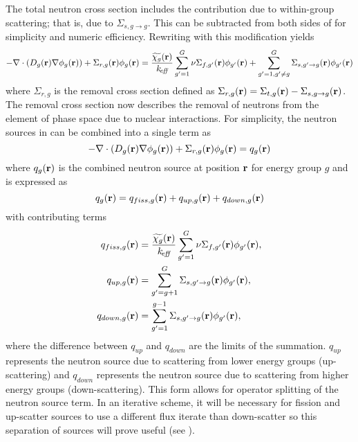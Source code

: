   The total neutron cross section includes the contribution due to within-group
  scattering; that is, due to $\Sigma_{s,g\rightarrow g}$. This can be
  subtracted from both sides of  for simplicity
  and numeric efficiency. Rewriting  with this
  modification yields
  \begin{equation} 
    \label{eq:multigroup_removal}
    - \mathbf{\nabla} \cdot( D_g(\mathbf{r}) \mathbf{\nabla} \phi_g(\mathbf{r})) + \Sigma_{r,g}(\mathbf{r}) \phi_g(\mathbf{r}) = 
      \frac{\widetilde{\chi_g}(\mathbf{r})}{k_{\!\mbox{\scriptsize \em eff}}} 
      \sum_{g'=1}^{G} \nu\Sigma_{f,g'}(\mathbf{r}) 
      \phi_{g'}(\mathbf{r}) + \sum_{g'=1, g' \ne g}^{G} 
      \Sigma_{s,g' \rightarrow g}(\mathbf{r}) \phi_{g'}(\mathbf{r})
  \end{equation}
  where $\Sigma_{r,g}$ is the removal cross section defined as
  $\Sigma_{r,g}(\mathbf{r}) = \Sigma_{t,g}(\mathbf{r}) - \Sigma_{s,g\rightarrow g}(\mathbf{r})$. The
  removal cross section now describes the removal of neutrons from the element
  of phase space due to nuclear interactions.  For simplicity, the neutron
  sources in  can be combined into a single term as
  \begin{equation}
    \label{eq:multigroup_source}
    - \mathbf{\nabla} \cdot( D_g(\mathbf{r}) \mathbf{\nabla} \phi_g(\mathbf{r})) + \Sigma_{r,g}(\mathbf{r}) \phi_g(\mathbf{r}) = 
      q_g(\mathbf{r})
  \end{equation}
  where $q_g(\mathbf{r})$ is the combined neutron source at position $\mathbf{r}$ for energy
  group $g$ and is expressed as
  \begin{equation}
    \label{eq:q}
    q_g(\mathbf{r}) = q_{fiss,g}(\mathbf{r}) + q_{up,g}(\mathbf{r}) + q_{down,g}(\mathbf{r}) 
  \end{equation}
  with contributing terms
  \begin{align}
    \label{eq:qfiss}
    q_{fiss,g}(\mathbf{r}) &= \frac{\widetilde{\chi_g}(\mathbf{r})}{k_{\!\mbox{\scriptsize \em eff}}} \sum_{g'=1}^{G} 
      \nu \Sigma_{f,g'}(\mathbf{r}) \phi_{g'}(\mathbf{r}), \\
    \label{eq:qup}
    q_{up,g}(\mathbf{r}) &= \sum_{g'=g+1}^{G} \Sigma_{s,g' \rightarrow g}(\mathbf{r})
      \phi_{g'}(\mathbf{r}), \\
    \label{eq:qdown}
    q_{down,g}(\mathbf{r}) &= \sum_{g'=1}^{g-1} \Sigma_{s,g' \rightarrow g}(\mathbf{r})
      \phi_{g'}(\mathbf{r}),
  \end{align}
  where the difference between $q_{up}$ and $q_{down}$ are the limits of the
  summation. $q_{up}$ represents the neutron source due to scattering from lower
  energy groups (up-scattering) and $q_{down}$ represents the neutron source due
  to scattering from higher energy groups (down-scattering). This form allows
  for operator splitting of the neutron source term. In an iterative scheme, it
  will be necessary for fission and up-scatter sources to use a different flux
  iterate than down-scatter so this separation of sources will prove useful (see
  ).

